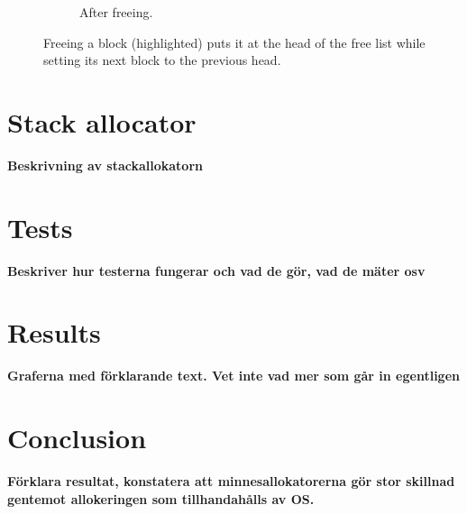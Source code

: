 \documentclass{article}
\begin{document}
\begin{figure}[tb]
\begin{subfigure}{.5\textwidth}
        \caption{After freeing.}
        \label{fig:pool_deallocation_after}
    \end{subfigure}
    \caption{Freeing a block (highlighted) puts it at the head of the free list while setting its next block to the previous head.}
    \label{fig:pool_deallocation}
\end{figure}

\section{Stack allocator}
\textbf{\large Beskrivning av stackallokatorn}

\section{Tests}
\textbf{\large Beskriver hur testerna fungerar och vad de gör, vad de mäter osv}

\section{Results}
\textbf{\large Graferna med förklarande text. Vet inte vad mer som går in egentligen}

\section{Conclusion}
\textbf{\large Förklara resultat, konstatera att minnesallokatorerna gör stor skillnad gentemot allokeringen som tillhandahålls av OS.}
\end{document}
